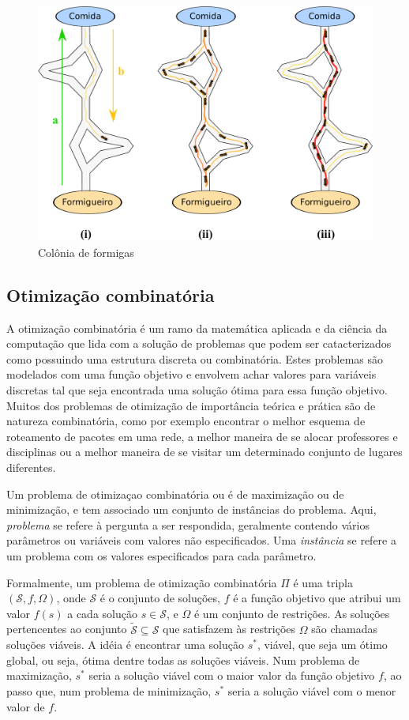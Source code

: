 \begin{figure}
\centering
 \includegraphics[scale=0.5]{fig/formigueiro-crop.pdf}
\caption{Colônia de formigas}
\label{fig:formigueiro}
\end{figure}


\subsection{Otimização combinatória}
A otimização combinatória é um ramo da matemática aplicada e da ciência da
computação que lida com a solução de problemas que podem ser catacterizados
como possuindo uma estrutura discreta ou combinatória. Estes problemas são
modelados com uma função objetivo e envolvem achar valores para variáveis
discretas tal que seja encontrada uma solução ótima para essa função objetivo.
Muitos dos problemas de otimização de importância teórica e prática são de
natureza combinatória, como por exemplo encontrar o melhor esquema de roteamento
de pacotes em uma rede, a melhor maneira de se alocar professores e disciplinas ou a
melhor maneira de se visitar um determinado conjunto de lugares diferentes. 

Um problema de otimizaçao combinatória ou é de maximização ou de minimização, e
tem associado um conjunto de instâncias do problema. Aqui, \textit{problema} se
refere à pergunta a ser respondida, geralmente contendo vários parâmetros ou
variáveis com valores não especificados. Uma \textit{instância} se refere a um
problema com os valores especificados para cada parâmetro.

Formalmente, um problema de otimização combinatória $\Pi$ é uma tripla
$(\mathcal{S}, f, \Omega)$, onde $\mathcal{S}$ é o conjunto de soluções, $f$ é
a função objetivo que atribui um valor $f(s)$ a cada solução $s \in
\mathcal{S}$, e $\Omega$ é um conjunto de restrições. As soluções pertencentes
ao conjunto $\tilde{\mathcal{S}} \subseteq \mathcal{S}$ que satisfazem às
restrições $\Omega$ são chamadas soluções viáveis. A idéia é encontrar uma
solução $s^{*}$, viável, que seja um ótimo global, ou seja, ótima dentre
todas as soluções viáveis. Num problema de maximização, $s^{*}$ seria a solução
viável com o maior valor da função objetivo $f$, ao passo que, num problema de
minimização, $s^{*}$ seria a solução viável com o menor valor de $f$.

